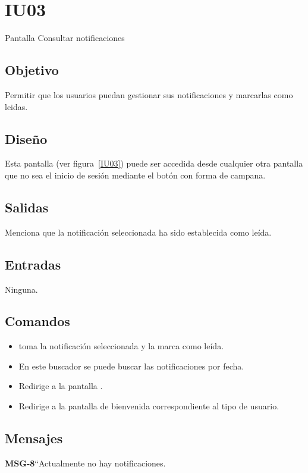 
\section{IU03} {Pantalla Consultar notificaciones}

\subsection{Objetivo}
Permitir que los usuarios puedan gestionar sus notificaciones y marcarlas como leidas.
\subsection{Diseño}
    Esta pantalla  (ver figura~\ref{IU03}) puede ser accedida desde cualquier otra pantalla que no sea el inicio de sesión mediante el botón con forma de campana.

\subsection{Salidas}
Menciona que la notificación seleccionada ha sido establecida como leída.
\subsection{Entradas}
   Ninguna.

\subsection{Comandos}
\begin{itemize}
    \item {} toma la notificación seleccionada y la marca como leída.
    \item {} En este buscador se puede buscar las notificaciones por fecha.
    \item {} Redirige a la pantalla .
    \item {} Redirige a la pantalla de bienvenida correspondiente al tipo de usuario.
\end{itemize}

\subsection{Mensajes}
     
\begin{Citemize}
    \item {\bf MSG-8}{``Actualmente no hay notificaciones.}
\end{Citemize}


